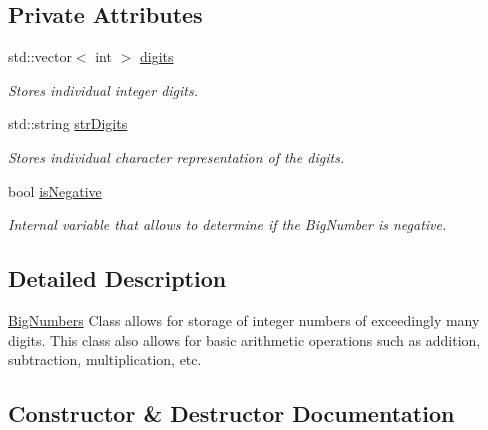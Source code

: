 \subsection*{Private Attributes}
\begin{DoxyCompactItemize}
\item 
\mbox{\label{class_big_numbers_adf1833235a5ccf2036ec6a9dce5692f2}} 
std\+::vector$<$ int $>$ \mbox{\hyperlink{class_big_numbers_adf1833235a5ccf2036ec6a9dce5692f2}{digits}}
\begin{DoxyCompactList}\small\item\em Stores individual integer digits. \end{DoxyCompactList}\item 
\mbox{\label{class_big_numbers_a93bea1e9584901af52f4da743af477db}} 
std\+::string \mbox{\hyperlink{class_big_numbers_a93bea1e9584901af52f4da743af477db}{str\+Digits}}
\begin{DoxyCompactList}\small\item\em Stores individual character representation of the digits. \end{DoxyCompactList}\item 
\mbox{\label{class_big_numbers_a4c8017d5fb30db62134cf83f5bb893ba}} 
bool \mbox{\hyperlink{class_big_numbers_a4c8017d5fb30db62134cf83f5bb893ba}{is\+Negative}}
\begin{DoxyCompactList}\small\item\em Internal variable that allows to determine if the Big\+Number is negative. \end{DoxyCompactList}\end{DoxyCompactItemize}


\subsection{Detailed Description}
\mbox{\hyperlink{class_big_numbers}{Big\+Numbers}} Class allows for storage of integer numbers of exceedingly many digits. This class also allows for basic arithmetic operations such as addition, subtraction, multiplication, etc. 

\subsection{Constructor \& Destructor Documentation}
\mbox{\label{class_big_numbers_af3dd82883f10f3473ac83280f26b0ad8}} 
